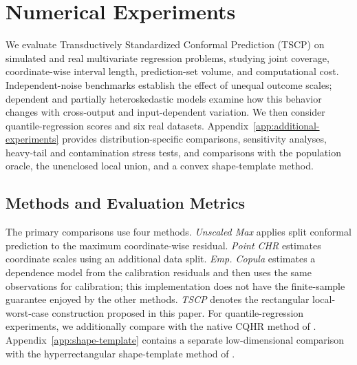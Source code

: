 
\begingroup
\color{blue}
\setlength{\emergencystretch}{2em}

\FloatBarrier
\section{Numerical Experiments}
\label{sec:numerical-experiments}
\label{sec:experiments}

We evaluate Transductively Standardized Conformal Prediction (TSCP) on
simulated and real multivariate regression problems, studying joint coverage,
coordinate-wise interval length, prediction-set volume, and computational
cost. Independent-noise benchmarks establish the effect of unequal outcome
scales; dependent and partially heteroskedastic models examine how this
behavior changes with cross-output and input-dependent variation. We then
consider quantile-regression scores and six real datasets.
Appendix~\ref{app:additional-experiments} provides distribution-specific
comparisons, sensitivity analyses, heavy-tail and contamination stress tests,
and comparisons with the population oracle, the unenclosed local union, and
a convex shape-template method.

\subsection{Methods and Evaluation Metrics}
\label{sec:experiment-methods}

The primary comparisons use four methods. \emph{Unscaled Max} applies split
conformal prediction to the maximum coordinate-wise residual. \emph{Point
CHR} estimates coordinate scales using an additional data split. \emph{Emp.
Copula} estimates a dependence model from the calibration residuals and then
uses the same observations for calibration; this implementation does not have
the finite-sample guarantee enjoyed by the other methods. \emph{TSCP} denotes
the rectangular local-worst-case construction proposed in this paper. For
quantile-regression experiments, we additionally compare with the native CQHR
method of \citet{sampson2024conformal}. Appendix~\ref{app:shape-template} contains a
separate low-dimensional comparison with the hyperrectangular shape-template
method of \citet{tumu2024templates}.

